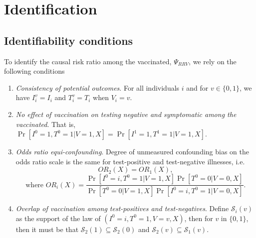 \documentclass[11pt]{article}
\begin{document}

\section{Identification} \label{sec:identification}
\subsection{Identifiability conditions} \label{sec:conditions}
    To identify the causal risk ratio among the vaccinated, $\Psi_{RRV}$, we rely on the following conditions
\begin{enumerate}[label=\upshape(A\arabic*), ref=A\arabic*]
    \item\label{ass1} \textit{Consistency of potential outcomes}. For all individuals $i$ and for $v \in \{0, 1\}$, we have $I_i^v = I_i$ and $T_i^v = T_i$ when $V_i = v$. 
    \item\label{ass2} \textit{No effect of vaccination on testing negative and symptomatic among the vaccinated}. That is, $\Pr[I^0 = 1, T^0=1 | V = 1, X] = \Pr[I^1 = 1, T^1=1 | V = 1, X].$
    \item\label{ass3} \textit{Odds ratio equi-confounding}. Degree of unmeasured confounding bias on the odds ratio scale is the same for test-positive and test-negative illnesses, i.e. 
    $$OR_2(X) = OR_1(X), $$
    $$ \text{where } OR_i(X) = \frac{\Pr[I^0 = i, T^0 = 1 | V = 1, X]\Pr[T^0 = 0 | V = 0, X]}{\Pr[T^0 = 0 | V = 1, X]\Pr[I^0 = i, T^0 = 1| V = 0, X]}.$$
    \item\label{ass4} \textit{Overlap of vaccination among test-positives and test-negatives}. Define $\mathcal{S}_i(v)$ as the support of the law of $(I^0 = i, T^0 = 1, V = v, X)$, then for $v$ in $\{0,1\}$, then it must be that $\mathcal{S}_2(1) \subseteq \mathcal{S}_2(0)$ and $\mathcal{S}_2(v) \subseteq \mathcal{S}_1(v).$
\end{enumerate}
\end{document}
